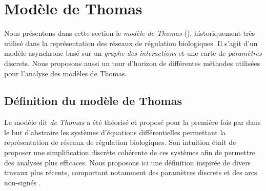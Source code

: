 
\section{Modèle de Thomas}

\TODO

Nous présentons dans cette section le \emph{modèle de Thomas} (),
historiquement très utilisé dans la représentation des réseaux de régulation biologiques.
Il s'agit d'un modèle asynchrone basé sur un \emph{graphe des interactions} et
une carte de \emph{paramètres} discrets.
Nous proposons aussi un tour d'horizon de différentes méthodes utilisées
pour l'analyse des modèles de Thomas.


\subsection{Définition du modèle de Thomas}

Le modèle dit \emph{de Thomas} a été théorisé et proposé pour la première
fois par  dans le but d'abstraire les systèmes
d'équations différentielles permettant la représentation de réseaux de régulation biologiques.
Son intuition était de proposer une simplification discrète cohérente de ces systèmes
afin de permettre des analyses plus efficaces.
Nous proposons ici une définition inspirée de divers travaux plus récents,
comportant notamment des paramètres discrets \cite{Snoussi89}
et des arcs non-signés \cite{FPIMR12-CMSB}.

\myskip


